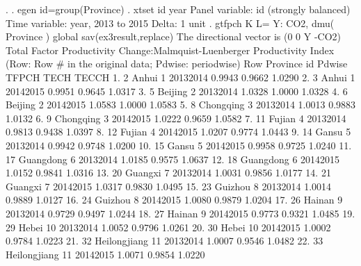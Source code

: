 . 
. egen id=group(Province)
{\smallskip}
. xtset id year
{\smallskip}
Panel variable: id (strongly balanced)
 Time variable: year, 2013 to 2015
         Delta: 1 unit
{\smallskip}
. gtfpch K L= Y: CO2, dmu( Province ) global sav(ex3result,replace)
{\smallskip}
 The directional vector is (0 0 Y -CO2)
{\smallskip}
{\smallskip}
 Total Factor Productivity Change:Malmquist-Luenberger Productivity Index
    (Row: Row \# in the original data; Pdwise: periodwise)
{\smallskip}
     {\TLC}
     {\VBAR} Row       Province   id      Pdwise    TFPCH     TECH    TECCH {\VBAR}
     {\LFTT}
  1. {\VBAR}   2          Anhui    1   2013{\tytilde}2014   0.9943   0.9662   1.0290 {\VBAR}
  2. {\VBAR}   3          Anhui    1   2014{\tytilde}2015   0.9951   0.9645   1.0317 {\VBAR}
  3. {\VBAR}   5        Beijing    2   2013{\tytilde}2014   1.0328   1.0000   1.0328 {\VBAR}
  4. {\VBAR}   6        Beijing    2   2014{\tytilde}2015   1.0583   1.0000   1.0583 {\VBAR}
  5. {\VBAR}   8      Chongqing    3   2013{\tytilde}2014   1.0013   0.9883   1.0132 {\VBAR}
  6. {\VBAR}   9      Chongqing    3   2014{\tytilde}2015   1.0222   0.9659   1.0582 {\VBAR}
  7. {\VBAR}  11         Fujian    4   2013{\tytilde}2014   0.9813   0.9438   1.0397 {\VBAR}
  8. {\VBAR}  12         Fujian    4   2014{\tytilde}2015   1.0207   0.9774   1.0443 {\VBAR}
  9. {\VBAR}  14          Gansu    5   2013{\tytilde}2014   0.9942   0.9748   1.0200 {\VBAR}
 10. {\VBAR}  15          Gansu    5   2014{\tytilde}2015   0.9958   0.9725   1.0240 {\VBAR}
 11. {\VBAR}  17      Guangdong    6   2013{\tytilde}2014   1.0185   0.9575   1.0637 {\VBAR}
 12. {\VBAR}  18      Guangdong    6   2014{\tytilde}2015   1.0152   0.9841   1.0316 {\VBAR}
 13. {\VBAR}  20        Guangxi    7   2013{\tytilde}2014   1.0031   0.9856   1.0177 {\VBAR}
 14. {\VBAR}  21        Guangxi    7   2014{\tytilde}2015   1.0317   0.9830   1.0495 {\VBAR}
 15. {\VBAR}  23        Guizhou    8   2013{\tytilde}2014   1.0014   0.9889   1.0127 {\VBAR}
 16. {\VBAR}  24        Guizhou    8   2014{\tytilde}2015   1.0080   0.9879   1.0204 {\VBAR}
 17. {\VBAR}  26         Hainan    9   2013{\tytilde}2014   0.9729   0.9497   1.0244 {\VBAR}
 18. {\VBAR}  27         Hainan    9   2014{\tytilde}2015   0.9773   0.9321   1.0485 {\VBAR}
 19. {\VBAR}  29          Hebei   10   2013{\tytilde}2014   1.0052   0.9796   1.0261 {\VBAR}
 20. {\VBAR}  30          Hebei   10   2014{\tytilde}2015   1.0002   0.9784   1.0223 {\VBAR}
 21. {\VBAR}  32   Heilongjiang   11   2013{\tytilde}2014   1.0007   0.9546   1.0482 {\VBAR}
 22. {\VBAR}  33   Heilongjiang   11   2014{\tytilde}2015   1.0071   0.9854   1.0220 {\VBAR}
